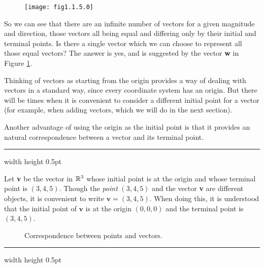 \begin{figure}[h]
 \begin{center}
  \texttt{[image: fig1.1.5.0]}
 \end{center}
 \caption[]{}
 \label{fig:veceq}
\end{figure}

So we can see that there are an infinite number of vectors for a given magnitude and direction, those vectors all
being equal and differing only by their initial and terminal points.  Is there a single vector which we can choose to
represent all those equal vectors?  The answer is yes, and is suggested by the vector \textbf{w} in Figure
\ref{fig:veceq}.


\vspace{3mm}
Thinking of vectors as starting from the origin provides a way of dealing with vectors in a standard way, since every
coordinate system has an origin.  But there
will be times when it is convenient to consider a different initial point for a vector (for example, when adding
vectors, which we will do in the next section).

Another advantage of using the origin as the initial point is that it provides an natural correspondence between a
vector and its terminal point.

\vspace{4mm}
\hrule width \textwidth height 0.5pt
\begin{exmp}
 Let \textbf{v} be the vector in $\mathbb{R}^{3}$ whose initial point is at the origin and whose terminal point
 is $(3,4,5)$.  Though the \emph{point} $(3,4,5)$ and the vector \textbf{v} are different objects, it is
 convenient to write $\textbf{v} = (3,4,5)$.  When doing this, it is understood that the initial point of $\textbf{v}$
 is at the origin $(0,0,0)$ and the terminal point is $(3,4,5)$.
\end{exmp}

\begin{figure}[h]
 \centering
 \qquad\qquad
 \caption[]{\quad Correspondence between points and vectors.}
 \label{fig:corresp}
\end{figure}
\hrule width \textwidth height 0.5pt
\vspace{4mm}

